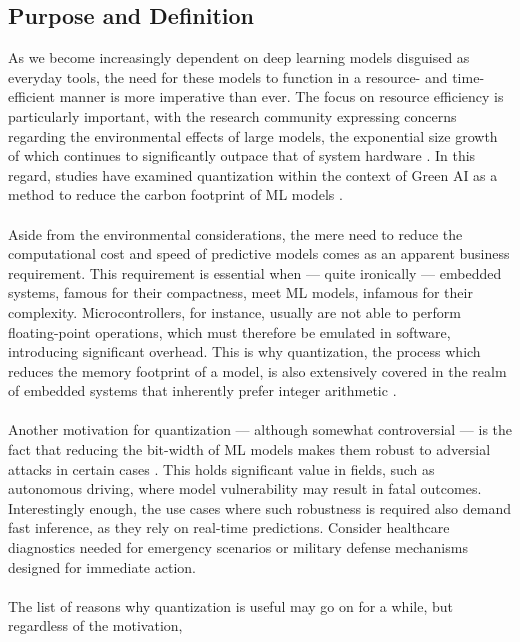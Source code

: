 \subsection{Purpose and Definition}
\label{subsec:subsection1}
As we become increasingly dependent on deep learning models disguised as everyday tools, 
the need for these models to function in a resource- and time-efficient manner is more imperative than ever. 
The focus on resource efficiency is particularly important, 
with the research community expressing concerns regarding the environmental effects of large models, 
the exponential size growth of which continues to significantly outpace that of system hardware \cite{DBLP:journals/corr/abs-2111-00364}. 
In this regard, studies have examined quantization within the context of Green AI as a method to reduce the carbon footprint of
ML models \cite{DBLP:journals/csi/RegueroMV25}.
\\
\\
Aside from the environmental considerations, the mere need to reduce 
the computational cost and speed of predictive models
comes as an apparent business requirement. 
This requirement is essential when — quite ironically — embedded systems, famous for their compactness, meet 
ML models, infamous for their complexity. Microcontrollers, for instance, 
usually are not able to perform floating-point operations, which must therefore be emulated in software, 
introducing significant overhead. This is why quantization, the process which reduces the memory footprint of a model,
is also extensively covered in the realm of embedded systems that 
inherently prefer integer arithmetic \cite{DBLP:conf/codit/KhalifaM24}\cite{DBLP:journals/corr/abs-2105-13331}.
\\
\\
Another motivation for quantization — although somewhat controversial — is the fact that reducing the bit-width of
ML models makes them robust to adversial attacks in certain cases \cite{DBLP:journals/corr/abs-2404-05639}.
This holds significant value in fields, such as autonomous driving,
where model vulnerability may result in fatal outcomes.
Interestingly enough, the use cases where such robustness is required also demand fast inference, 
as they rely on real-time predictions. Consider healthcare diagnostics needed for emergency scenarios 
or military defense mechanisms designed for immediate action.
\\
\\
The list of reasons why quantization is useful may go on for a while, but regardless of the motivation,

